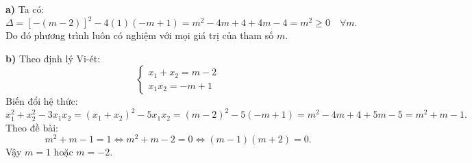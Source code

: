 \begin{loi_giai_cau}
\textbf{a)} Ta có:
\[\Delta = [-(m-2)]^2 - 4(1)(-m+1) = m^2 - 4m + 4 + 4m - 4 = m^2 \ge 0 \quad \forall m.\]
Do đó phương trình luôn có nghiệm với mọi giá trị của tham số $m$.

\textbf{b)} Theo định lý Vi-ét:
\[\begin{cases} x_1 + x_2 = m - 2 \\ x_1 x_2 = -m + 1 \end{cases}\]
Biến đổi hệ thức:
\[x_1^2 + x_2^2 - 3x_1 x_2 = (x_1+x_2)^2 - 5x_1 x_2 = (m-2)^2 - 5(-m+1) = m^2 - 4m + 4 + 5m - 5 = m^2 + m - 1.\]
Theo đề bài:
\[m^2 + m - 1 = 1 \iff m^2 + m - 2 = 0 \iff (m-1)(m+2) = 0.\]
Vậy $\boxed{m = 1}$ hoặc $\boxed{m = -2}$.
\end{loi_giai_cau}
